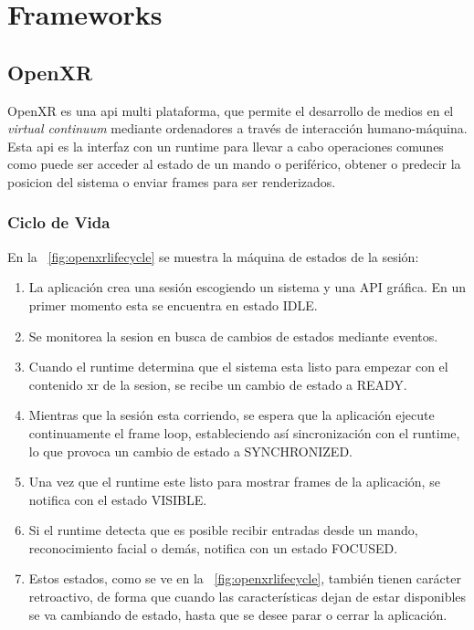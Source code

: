 \section{Frameworks}
\subsection{OpenXR}
OpenXR es una \acrfull{api} multi plataforma, que permite el desarrollo de medios en el \textit{virtual continuum} mediante ordenadores a través de interacción  humano-máquina.
Esta \acrshort{api} es la interfaz con un runtime para llevar a cabo operaciones comunes como puede ser acceder al estado de un mando o periférico, obtener o predecir la posicion del sistema o enviar frames para ser renderizados.

\subsubsection{Ciclo de Vida}
En la \figurename~\ref{fig:openxrlifecycle} se muestra la máquina de estados de la sesión:
\begin{enumerate}
    \item La aplicación crea una sesión escogiendo un sistema y una API gráfica. En un primer momento esta se encuentra en estado IDLE.
    \item Se monitorea la sesion en busca de cambios de estados mediante eventos.
    \item Cuando el runtime determina que el sistema esta listo para empezar con el contenido \acrshort{xr} de la sesion, se recibe un cambio de estado a READY.
    \item Mientras que la sesión esta corriendo, se espera que la aplicación ejecute continuamente el frame loop, estableciendo así sincronización con el runtime, lo que provoca un cambio de estado a SYNCHRONIZED.
    \item Una vez que el runtime este listo para mostrar frames de la aplicación, se notifica con el estado VISIBLE.
    \item Si el runtime detecta que es posible recibir entradas desde un mando, reconocimiento facial o demás, notifica con un estado FOCUSED.
    \item Estos estados, como se ve en la \figurename~\ref{fig:openxrlifecycle}, también tienen carácter retroactivo, de forma que cuando las características dejan de estar disponibles se va cambiando de estado, hasta que se desee parar o cerrar la aplicación.
    
\end{enumerate}

